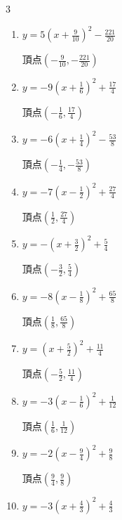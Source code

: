 \begin{multicols}{3}
\begin{enumerate}
  \item $\displaystyle y=5\left( x+\frac{9}{10}\right)^{2}-\frac{221}{20}$

        $\displaystyle 頂点\left( -\frac{9}{10} , -\frac{221}{20} \right)$

  \item $\displaystyle y=-9\left( x+\frac{1}{6}\right)^{2}+\frac{17}{4}$

        $\displaystyle 頂点\left( -\frac{1}{6} , \frac{17}{4} \right)$

  \item $\displaystyle y=-6\left( x+\frac{1}{4}\right)^{2}-\frac{53}{8}$

        $\displaystyle 頂点\left( -\frac{1}{4} , -\frac{53}{8} \right)$

  \item $\displaystyle y=-7\left( x-\frac{1}{2}\right)^{2}+\frac{27}{4}$

        $\displaystyle 頂点\left( \frac{1}{2} , \frac{27}{4} \right)$

  \item $\displaystyle y=-\left( x+\frac{3}{2}\right)^{2}+\frac{5}{4}$

        $\displaystyle 頂点\left( -\frac{3}{2} , \frac{5}{4} \right)$

  \item $\displaystyle y=-8\left( x-\frac{1}{8}\right)^{2}+\frac{65}{8}$

        $\displaystyle 頂点\left( \frac{1}{8} , \frac{65}{8} \right)$

  \item $\displaystyle y=\left( x+\frac{5}{2}\right)^{2}+\frac{11}{4}$

        $\displaystyle 頂点\left( -\frac{5}{2} , \frac{11}{4} \right)$

  \item $\displaystyle y=-3\left( x-\frac{1}{6}\right)^{2}+\frac{1}{12}$

        $\displaystyle 頂点\left( \frac{1}{6} , \frac{1}{12} \right)$

  \item $\displaystyle y=-2\left( x-\frac{9}{4}\right)^{2}+\frac{9}{8}$

        $\displaystyle 頂点\left( \frac{9}{4} , \frac{9}{8} \right)$

\columnbreak %

  \item $\displaystyle y=-3\left( x+\frac{4}{3}\right)^{2}+\frac{4}{3}$


\end{enumerate}
\end{multicols}
